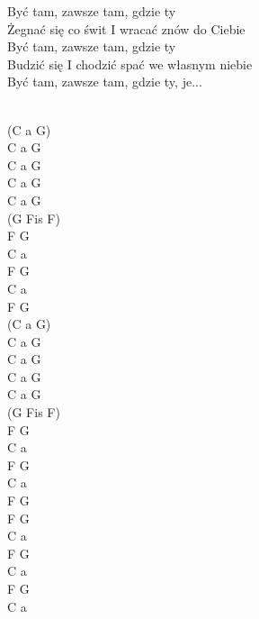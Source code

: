 \documentclass[a5paper, 10pt]{book}
\begin{document}
\begin{minipage}[t]{0.7\textwidth}
\hspace*{4mm}Być tam, zawsze tam, gdzie ty\\
\hspace*{4mm}Żegnać się co świt I wracać znów do Ciebie\\
\hspace*{4mm}Być tam, zawsze tam, gdzie ty\\
\hspace*{4mm}Budzić się I chodzić spać we własnym niebie\\
\hspace*{4mm}Być tam, zawsze tam, gdzie ty, je...\\
\\
\end{minipage}
\begin{minipage}[t]{0.3\textwidth}
(C a G)\\
C a G\\ 
C a G\\ 
C a G\\ 
C a G\\ 
(G Fis F)\\
F G\\
C a\\
F G\\
C a\\
F G\\
(C a G)\\
C a G\\ 
C a G\\ 
C a G\\ 
C a G\\ 
(G Fis F)\\
F G\\
C a\\
F G\\
C a\\
F G\\
F G\\
C a\\
F G\\
C a\\
F G\\
C a\\
\end{minipage}

\newpage
\end{document}
